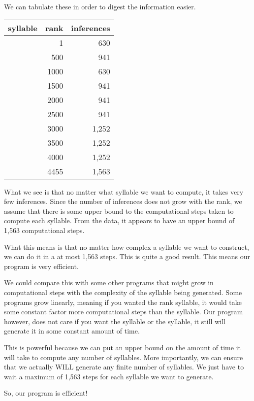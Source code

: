 \documentclass[12pt,letterpaper]{article}
\begin{document}
\begin{enumerate}
      We can tabulate these in order to digest the information easier.

      \begin{tabular}{| l | r | r |}
        \hline
        syllable & rank & inferences \\
        \hline
        \hline
        [p, a]       & 1    & 630 \\
        \hline
        [m, o, g]    & 500  & 941 \\
        \hline
        [n, i]       & 1000 & 630 \\
        \hline
        [s, a, x]    & 1500 & 941 \\
        \hline
        [x, u, p]    & 2000 & 941 \\
        \hline
        [r, i, l]    & 2500 & 941 \\
        \hline
        [b, l, e, b] & 3000 & 1,252 \\
        \hline
        [p, ɾ, u, ʎ] & 3500 & 1,252 \\
        \hline
        [k, ɾ, o, m] & 4000 & 1,252 \\
        \hline
        [f, ɾ, u, ɾ, s] & 4455 & 1,563 \\
        \hline
      \end{tabular}

      What we see is that no matter what syllable we want to compute, it takes very few inferences. Since the number of inferences does not grow with the rank, we assume that there is some upper bound to the computational steps taken to compute each syllable. From the data, it appears to have an upper bound of 1,563 computational steps.

      What this means is that no matter how complex a syllable we want to construct, we can do it in a at most 1,563 steps.
      This is quite a good result. This means our program is very efficient.

      We could compare this with some other programs that might grow in computational steps with the complexity of the syllable being generated.
      Some programs grow linearly, meaning if you wanted the  rank syllable, it would take some constant factor more computational steps than the  syllable.
      Our program however, does not care if you want the  syllable or the  syllable, it still will generate it in some constant amount of time.

      This is powerful because we can put an upper bound on the amount of time it will take to compute any number of syllables.
      More importantly, we can ensure that we actually WILL generate any finite number of syllables. We just have to wait a maximum of 1,563 steps for each syllable we want to generate.

      So, our program is efficient!
  \end{enumerate}
\end{document}
